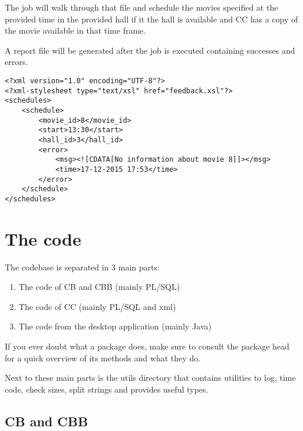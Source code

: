 \documentclass[a4paper]{article}
\begin{document}
The job will walk through that file and schedule the movies specified at the provided time in the provided hall if it the hall is available and CC has a copy of the movie available in that time frame.\par
A report file will be generated after the job is executed containing successes and errors.

\begin{verbatim}
<?xml version="1.0" encoding="UTF-8"?>
<?xml-stylesheet type="text/xsl" href="feedback.xsl"?>
<schedules>
    <schedule>
        <movie_id>8</movie_id>
        <start>13:30</start>
        <hall_id>3</hall_id>
        <error>
            <msg><![CDATA[No information about movie 8]]></msg>
            <time>17-12-2015 17:53</time>
        </error>
    </schedule>
</schedules>
\end{verbatim}

\section{The code}

The codebase is separated in 3 main parts:
\begin{enumerate}
	\item The code of CB and CBB (mainly PL/SQL)
	\item The code of CC (mainly PL/SQL and xml)
	\item The code from the desktop application (mainly Java)
\end{enumerate}
If you ever doubt what a package does, make sure to consult the package head for a quick overview of its methods and what they do.\par
Next to these main parts is the utils directory that contains utilities to log, time code, check sizes, split strings and provides useful types.

\subsection{CB and CBB}
\end{document}
